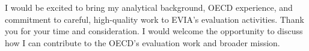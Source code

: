 \documentclass[11pt,a4paper,roman]{moderncv}
\begin{document}
\vspace{1em}
I would be excited to bring my analytical background, OECD experience, and commitment to careful, high-quality work to EVIA's evaluation activities. Thank you for your time and consideration. I would welcome the opportunity to discuss how I can contribute to the OECD's evaluation work and broader mission.

\vspace{0.5cm}


\makeletterclosing
\end{document}
